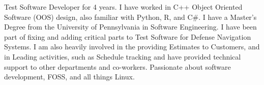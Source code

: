 

\begin{cvparagraph}

Test Software Developer for 4 years. I have worked in C++ Object Oriented Software (OOS) design, also familiar with Python, R, and C\#. I have a Master's Degree from the University of Pennsylvania in 
	Software Engineering. I have been part of fixing and adding critical parts to Test Software for Defense Navigation Systems. I am also heavily involved in the providing Estimates to Customers, and in 
	Leading activities, such as Schedule tracking and have provided technical support to other departments and co-workers. Passionate about software development, FOSS, and all things Linux.
\end{cvparagraph}
